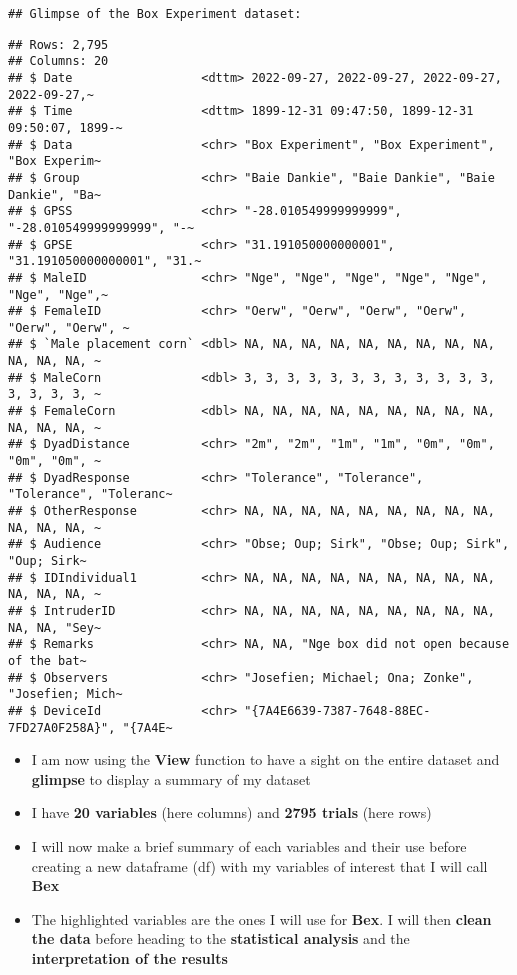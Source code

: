 \documentclass[
]{article}
\begin{document}
\begin{verbatim}
## Glimpse of the Box Experiment dataset:
\end{verbatim}

\begin{verbatim}
## Rows: 2,795
## Columns: 20
## $ Date                  <dttm> 2022-09-27, 2022-09-27, 2022-09-27, 2022-09-27,~
## $ Time                  <dttm> 1899-12-31 09:47:50, 1899-12-31 09:50:07, 1899-~
## $ Data                  <chr> "Box Experiment", "Box Experiment", "Box Experim~
## $ Group                 <chr> "Baie Dankie", "Baie Dankie", "Baie Dankie", "Ba~
## $ GPSS                  <chr> "-28.010549999999999", "-28.010549999999999", "-~
## $ GPSE                  <chr> "31.191050000000001", "31.191050000000001", "31.~
## $ MaleID                <chr> "Nge", "Nge", "Nge", "Nge", "Nge", "Nge", "Nge",~
## $ FemaleID              <chr> "Oerw", "Oerw", "Oerw", "Oerw", "Oerw", "Oerw", ~
## $ `Male placement corn` <dbl> NA, NA, NA, NA, NA, NA, NA, NA, NA, NA, NA, NA, ~
## $ MaleCorn              <dbl> 3, 3, 3, 3, 3, 3, 3, 3, 3, 3, 3, 3, 3, 3, 3, 3, ~
## $ FemaleCorn            <dbl> NA, NA, NA, NA, NA, NA, NA, NA, NA, NA, NA, NA, ~
## $ DyadDistance          <chr> "2m", "2m", "1m", "1m", "0m", "0m", "0m", "0m", ~
## $ DyadResponse          <chr> "Tolerance", "Tolerance", "Tolerance", "Toleranc~
## $ OtherResponse         <chr> NA, NA, NA, NA, NA, NA, NA, NA, NA, NA, NA, NA, ~
## $ Audience              <chr> "Obse; Oup; Sirk", "Obse; Oup; Sirk", "Oup; Sirk~
## $ IDIndividual1         <chr> NA, NA, NA, NA, NA, NA, NA, NA, NA, NA, NA, NA, ~
## $ IntruderID            <chr> NA, NA, NA, NA, NA, NA, NA, NA, NA, NA, NA, "Sey~
## $ Remarks               <chr> NA, NA, "Nge box did not open because of the bat~
## $ Observers             <chr> "Josefien; Michael; Ona; Zonke", "Josefien; Mich~
## $ DeviceId              <chr> "{7A4E6639-7387-7648-88EC-7FD27A0F258A}", "{7A4E~
\end{verbatim}

\begin{itemize}
\item
  I am now using the \textbf{View} function to have a sight on the
  entire dataset and \textbf{glimpse} to display a summary of my dataset
\item
  I have \textbf{20 variables} (here columns) and \textbf{2795 trials}
  (here rows)
\item
  I will now make a brief summary of each variables and their use before
  creating a new dataframe (df) with my variables of interest that I
  will call \textbf{Bex}
\item
  The highlighted variables are the ones I will use for \textbf{Bex}. I
  will then \textbf{clean the data} before heading to the
  \textbf{statistical analysis} and the \textbf{interpretation of the
  results}
\end{itemize}
\end{document}
